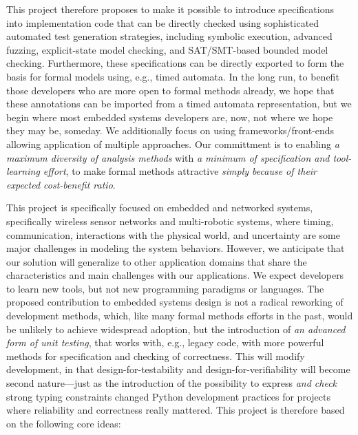 This project therefore proposes to make it possible to introduce specifications into implementation code that can be directly checked using sophisticated automated test generation strategies, including symbolic execution, advanced fuzzing, explicit-state model checking, and SAT/SMT-based bounded model checking.   Furthermore, these specifications can be directly exported to form the basis for formal models using, e.g., timed automata.  In the long run, to benefit those developers who are more open to formal methods already, we hope that these annotations can be imported from a timed automata representation, but we begin where most embedded systems developers are, now, not where we hope they may be, someday.
We additionally focus on using frameworks/front-ends allowing application of multiple approaches.  Our committment is to enabling \emph{a maximum diversity of analysis methods} with \emph{a minimum of specification and tool-learning effort}, to make formal methods attractive \emph{simply because of their expected cost-benefit ratio}.

This project is specifically focused on embedded and networked systems, specifically wireless sensor networks and multi-robotic systems, where timing, communication, interactions with the physical world, and uncertainty are some major challenges in modeling the system behaviors.
However, we anticipate that our solution will generalize to other application domains that share the characteristics and main challenges with our applications.
We expect developers to learn new tools, but not new programming paradigms or languages.  The proposed contribution to embedded systems design is not a radical reworking of development methods, which, like many formal methods efforts in the past, would be unlikely to achieve widespread adoption, but the introduction of \emph{an advanced form of unit testing}, that works with, e.g., legacy code, with more powerful methods for specification and checking of correctness. This will modify development, in that design-for-testability and design-for-verifiability will become second nature---just as the introduction of the possibility to express \emph{and check} strong typing constraints changed Python development practices for projects where reliability and correctness really mattered.  This project is therefore based on the following core ideas:

